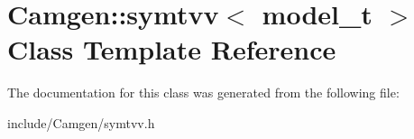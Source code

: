 \hypertarget{a00520}{\section{Camgen\-:\-:symtvv$<$ model\-\_\-t $>$ Class Template Reference}
\label{a00520}
}


The documentation for this class was generated from the following file\-:\begin{DoxyCompactItemize}
\item 
include/\-Camgen/symtvv.\-h\end{DoxyCompactItemize}
